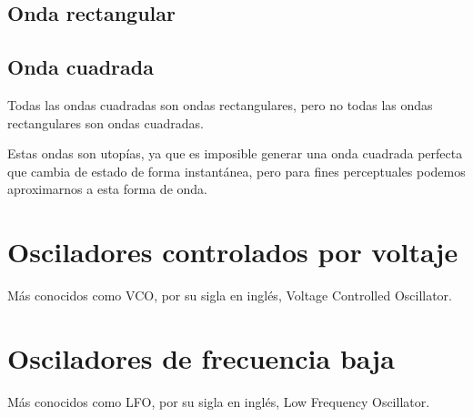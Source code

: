 \documentclass[../principal.tex]{subfiles}
\begin{document}
\subsection{Onda rectangular}

\subsection{Onda cuadrada}

Todas las ondas cuadradas son ondas rectangulares, pero no todas las ondas rectangulares son ondas cuadradas.

Estas ondas son utopías, ya que es imposible generar una onda cuadrada perfecta que cambia de estado de forma instantánea, pero para fines perceptuales podemos aproximarnos a esta forma de onda.



\section{Osciladores controlados por voltaje}

Más conocidos como VCO, por su sigla en inglés, Voltage Controlled Oscillator.

\section{Osciladores de frecuencia baja}

Más conocidos como LFO, por su sigla en inglés, Low Frequency Oscillator.

\newpage
\end{document}
